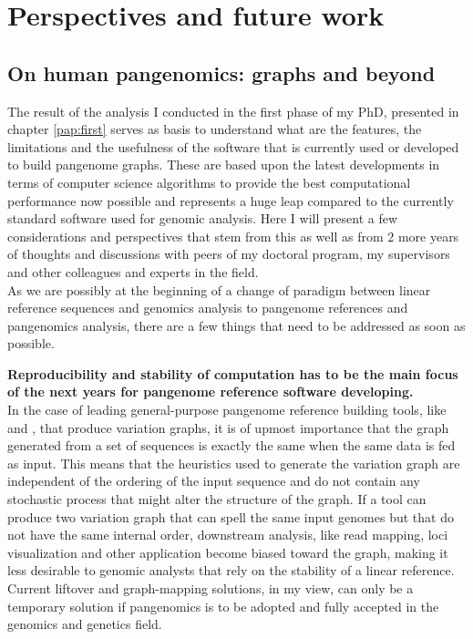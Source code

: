 
\chapter{Perspectives and future work}
\label{sec:perspectives}

\section{On human pangenomics: graphs and beyond}
The result of the analysis I conducted in the first phase of my PhD, presented in chapter \ref{pap:first} serves as basis to understand what are the features, the limitations and the usefulness of the software that is currently used or developed to build pangenome graphs. These are based upon the latest developments in terms of computer science algorithms to provide the best computational performance now possible and represents a huge leap compared to the currently standard software used for genomic analysis.
Here I will present a few considerations and perspectives that stem from this as well as from 2 more years of thoughts and discussions with peers of my doctoral program, my supervisors and other colleagues and experts in the field. \\
As we are possibly at the beginning of a change of paradigm between linear reference sequences and genomics analysis to pangenome references and pangenomics analysis, there are a few things that need to be addressed as soon as possible. 

\textbf{Reproducibility and stability of computation has to be the main focus of the next years for pangenome reference software developing. \\}
In the case of leading general-purpose pangenome reference building tools, like \pggb and \mcactus, that produce variation graphs, it is of upmost importance that the graph generated from a set of sequences is exactly the same when the same data is fed as input. This means that the heuristics used to generate the variation graph are independent of the ordering of the input sequence and do not contain any stochastic process that might alter the structure of the graph. If a tool can produce two variation graph that can spell the same input genomes but that do not have the same internal order, downstream analysis, like read mapping, loci visualization and other application become biased toward the graph, making it less desirable to genomic analysts that rely on the stability of a linear reference. Current liftover and graph-mapping solutions, in my view, can only be a temporary solution if pangenomics is to be adopted and fully accepted in the genomics and genetics field.

